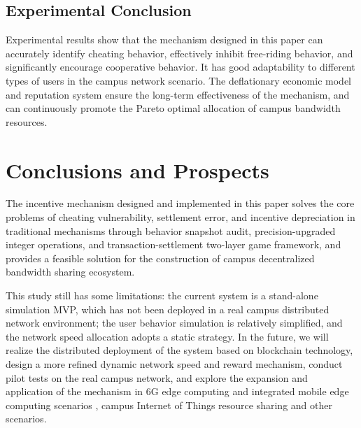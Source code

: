 \documentclass[conference,letterpaper]{IEEEtran}
\begin{document}
\subsection{Experimental Conclusion}

Experimental results show that the mechanism designed in this paper can accurately identify cheating behavior, effectively inhibit free-riding behavior, and significantly encourage cooperative behavior. It has good adaptability to different types of users in the campus network scenario. The deflationary economic model and reputation system ensure the long-term effectiveness of the mechanism, and can continuously promote the Pareto optimal allocation of campus bandwidth resources.

\section{Conclusions and Prospects}

The incentive mechanism designed and implemented in this paper solves the core problems of cheating vulnerability, settlement error, and incentive depreciation in traditional mechanisms through behavior snapshot audit, precision-upgraded integer operations, and transaction-settlement two-layer game framework, and provides a feasible solution for the construction of campus decentralized bandwidth sharing ecosystem.

This study still has some limitations: the current system is a stand-alone simulation MVP, which has not been deployed in a real campus distributed network environment; the user behavior simulation is relatively simplified, and the network speed allocation adopts a static strategy. In the future, we will realize the distributed deployment of the system based on blockchain technology, design a more refined dynamic network speed and reward mechanism, conduct pilot tests on the real campus network, and explore the expansion and application of the mechanism in 6G edge computing and integrated mobile edge computing scenarios \cite{qiu2022}, campus Internet of Things resource sharing and other scenarios.



\end{document}
